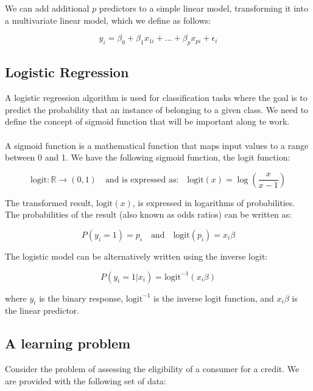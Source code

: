 \documentclass[../main.tex]{subfiles}
\begin{document}
\noindent We can add additional $p$ predictors to a simple linear model, transforming it into a multivariate linear model, which we define as follows:

$$y_i = \beta_0 + \beta_1x_{1i} + \ldots + \beta_px_{pi} + \epsilon_i $$

\subsection{Logistic Regression}
\noindent A logistic regression algorithm is used for classification tasks where the goal is to predict the probability that an instance of belonging to a given class. We need to define the concept of sigmoid function that will be important along te work. \\ \\ A sigmoid function is a mathematical function that maps input values to a range between 0 and 1. We have the following sigmoid function, the logit function: 

\[
\text{logit}: \mathbb{R} \to (0,1)
\quad \text{and is expressed as:} \quad
\text{logit}(x) = \log\left(\frac{x}{x-1}\right)
\]

\noindent The transformed result, $\text{logit}(x)$, is expressed in logarithms of probabilities. The probabilities of the result (also known as odds ratios) can be written as:

\[
P(y_i = 1) = p_i \quad \text{and} \quad \text{logit}(p_i) = x_i \beta
\]

The logistic model can be alternatively written using the inverse logit:

\[
P(y_i = 1 | x_i) = \text{logit}^{-1}(x_i \beta)
\]

\noindent where $y_i$ is the binary response, $\text{logit}^{-1}$ is the inverse logit function, and $x_i \beta$ is the linear predictor.


\subsection{A learning problem}
\noindent Consider the problem of assessing the eligibility of a consumer for a credit. We are provided with the following set of data: \\ 
\end{document}
